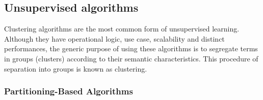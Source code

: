 \documentclass{ieeeaccess}
\begin{document}

\subsection {Unsupervised algorithms}


Clustering algorithms are the most common form of unsupervised learning. Although they have operational logic, use case, scalability and distinct performances, the generic purpose of using these algorithms is to segregate terms in groups (clusters) according to their semantic characteristics. This procedure of separation into groups is known as clustering.


\subsubsection {Partitioning-Based Algorithms}
\end{document}
